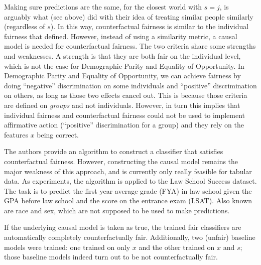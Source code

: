 Making sure predictions are the same, for the closest world with \(s=j\),
is arguably what \citet{dwork2012fairness} (see above) did
with their idea of treating similar people similarly (regardless of \(s\)).
In this way, counterfactual fairness is similar to the individual fairness
that \citet{dwork2012fairness} defined.
However, instead of using a similarity metric,
a causal model is needed for counterfactual fairness.
The two criteria share some strengths and weaknesses.
A strength is that they are both fair on the individual level,
which is not the case for Demographic Parity and Equality of Opportunity.
In Demographic Parity and Equality of Opportunity,
we can achieve fairness by doing ``negative'' discrimination on some individuals
and ``positive'' discrimination on others, as long as those two effects cancel out.
This is because those criteria are defined on \emph{groups} and not individuals.
However, in turn this implies that individual fairness and counterfactual fairness
could not be used to implement affirmative action (``positive'' discrimination for a group)
and they rely on the features \(x\) being correct.

The authors provide an algorithm to construct a classifier that satisfies counterfactual fairness.
However, constructing the causal model remains the major weakness of this approach,
and is currently only really feasible for tabular data.
As experiments, the algorithm is applied to the Law School Success dataset.
The task is to predict the first year average grade (FYA) in law school
given the GPA before law school and the score on the entrance exam (LSAT).
Also known are race and sex, which are not supposed to be used to make predictions.

If the underlying causal model is taken as true,
the trained fair classifiers are automatically completely counterfactually fair.
Additionally, two (unfair) baseline models were trained:
one trained on only \(x\) and the other trained on \(x\) and \(s\);
those baseline models indeed turn out to be not counterfactually fair.

